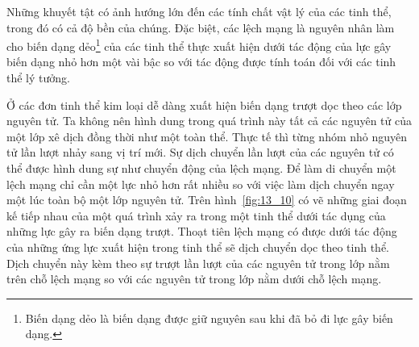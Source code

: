 
Những khuyết tật có ảnh hướng lớn đến các tính chất vật lý của các tinh thể, trong đó có cả độ bền của chúng. Đặc biệt, các lệch mạng là nguyên nhân làm cho biến dạng dẻo\footnote{Biến dạng dẻo là biến dạng được giữ nguyên sau khi đã bỏ đi lực gây biến dạng.} của các tinh thể thực xuất hiện dưới tác động của lực gây biến dạng nhỏ hơn một vài bậc so với tác động được tính toán đối với các tinh thể lý tưởng.


Ở các đơn tinh thể kim loại dễ dàng xuất hiện biến dạng trượt dọc theo các lớp nguyên tử. Ta không nên hình dung trong quá trình này tất cả các nguyên tử của một lớp xê dịch đồng thời như một toàn thể. Thực tế thì từng nhóm nhỏ nguyên tử lần lượt nhảy sang vị trí mới. Sự dịch chuyển lần lượt của các nguyên tử có thể được hình dung sự như chuyển động của lệch mạng. Để làm di chuyển một lệch mạng chỉ cần một lực nhỏ hơn rất nhiều so với việc làm dịch chuyển ngay một lúc toàn bộ một lớp nguyên tử. Trên hình~\ref{fig:13_10} có vẽ những giai đoạn kế tiếp nhau của một quá trình xảy ra trong một tinh thể dưới tác dụng của những lực gây ra biến dạng trượt. Thoạt tiên lệch mạng có được dưới tác động của những ứng lực xuất hiện trong tinh thể sẽ dịch chuyển dọc theo tinh thể. Dịch chuyển này kèm theo sự trượt lần lượt của các nguyên tử trong lớp nằm trên chỗ lệch mạng so với các nguyên tử trong lớp nằm dưới chỗ lệch mạng.

